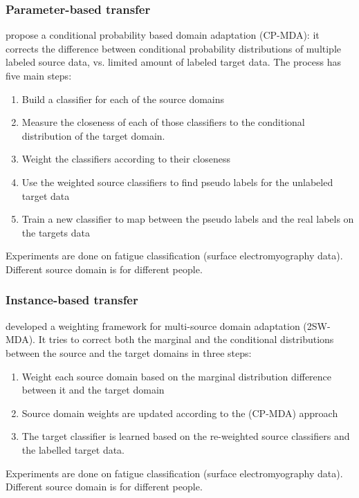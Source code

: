   \subsubsection{Parameter-based transfer}
  \citep{chattopadhyay2012multisource} propose a conditional probability based domain adaptation (CP-MDA): it corrects the difference between conditional probability distributions of multiple labeled source data, vs. limited amount of labeled target data. The process has five main steps:
  \begin{enumerate}
      \item Build a classifier for each of the source domains
      \item Measure the closeness of each of those classifiers to the conditional distribution of the target domain.
      \item Weight the classifiers according to their closeness
      \item Use the weighted source classifiers to find pseudo labels for the unlabeled target data
      \item Train a new classifier to map between the pseudo labels and the real labels on the targets data
  \end{enumerate}
  Experiments are done on fatigue classification (surface electromyography data). Different source domain is for different people.

  \subsubsection{Instance-based transfer}
  \citep{chattopadhyay2012multisource} developed a weighting framework for multi-source domain adaptation (2SW-MDA). It tries to correct both the marginal and the conditional distributions between the source and the target domains in three steps:
  \begin{enumerate}
      \item Weight each source domain based on the marginal distribution difference between it and the target domain
      \item Source domain weights are updated according to the (CP-MDA) approach
      \item The target classifier is learned based on the re-weighted source classifiers and the labelled target data.
  \end{enumerate}
  Experiments are done on fatigue classification (surface electromyography data). Different source domain is for different people.

